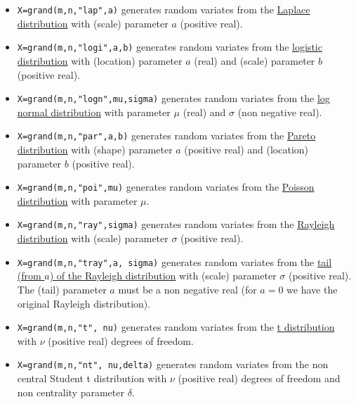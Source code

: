 \begin{description}
\begin{itemize}
\item {} 
  \verb!X=grand(m,n,"lap",a)! generates random variates from the \hyperlink{lappdf}{Laplace 
  distribution} with (scale) parameter $a$ (positive real).
  
\item {} 
  \verb!X=grand(m,n,"logi",a,b)! generates random variates from the \hyperlink{logipdf}{logistic 
  distribution} with (location) parameter $a$ (real) and (scale) parameter $b$ (positive real).
  
\item {} 
  \verb!X=grand(m,n,"logn",mu,sigma)! generates random variates from the  \hyperlink{lognpdf}{log normal
  distribution} with parameter $\mu$ (real) and  $\sigma$ (non negative real).
  
\item {} 
  \verb!X=grand(m,n,"par",a,b)! generates random variates from the  \hyperlink{parpdf}{Pareto 
  distribution} with (shape) parameter $a$ (positive real) and (location) parameter $b$ (positive real).

\item {} \verb!X=grand(m,n,"poi",mu)! generates random
  variates from the \hyperlink{poipdf}{Poisson distribution} with parameter $\mu$. 
  
\item {} 
  \verb!X=grand(m,n,"ray",sigma)! generates random variates from the  \hyperlink{raypdf}{Rayleigh 
  distribution} with (scale) parameter $\sigma$ (positive real).
  
\item {} 
  \verb!X=grand(m,n,"tray",a, sigma)! generates random variates from the
  \hyperlink{traypdf}{tail (from $a$) of the Rayleigh distribution} with (scale) parameter 
  $\sigma$ (positive real). The (tail) parameter $a$ must be a non negative
  real (for $a=0$ we have the original Rayleigh distribution).

\item {} 
  \verb!X=grand(m,n,"t", nu)! generates random variates from the  \hyperlink{tpdf}{t distribution} 
  with $\nu$ (positive real) degrees of freedom. 

\item {} 
  \verb!X=grand(m,n,"nt", nu,delta)! generates random variates from the non central Student t distribution
  with $\nu$ (positive real) degrees of freedom and non centrality parameter $\delta$. 


\end{itemize}
\end{description}
